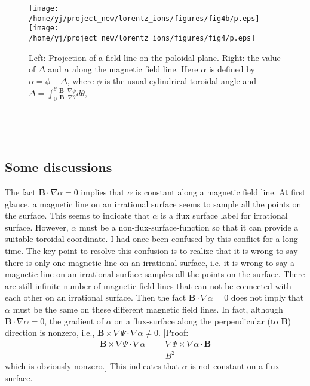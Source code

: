 \documentclass{article}
\begin{document}
\begin{figure}[h]
  \texttt{[image: /home/yj/project\_new/lorentz\_ions/figures/fig4b/p.eps]}\texttt{[image: /home/yj/project\_new/lorentz\_ions/figures/fig4/p.eps]}
  \caption{\label{17-10-2-p1}Left: Projection of a field line on the poloidal
  plane. Right: the value of $\Delta$ and $\alpha$ along the magnetic field
  line. Here $\alpha$ is defined by $\alpha = \phi - \Delta$, where $\phi$ is
  the usual cylindrical toroidal angle and $\Delta = \int_0^{\theta}
  \frac{\mathbf{B} \cdot \nabla \phi}{\mathbf{B} \cdot \nabla \theta} d
  \theta,$}
\end{figure}

\

\

\subsection{Some discussions}

The fact $\mathbf{B} \cdot \nabla \alpha = 0$ implies that $\alpha$ is
constant along a magnetic field line. At first glance, a magnetic line on an
irrational surface seems to sample all the points on the surface. This seems
to indicate that $\alpha$ is a flux surface label for irrational surface.
However, $\alpha$ must be a non-flux-surface-function so that it can provide a
suitable toroidal coordinate. I had once been confused by this conflict for a
long time. The key point to resolve this confusion is to realize that it is
wrong to say there is only one magnetic line on an irrational surface, i.e. it
is wrong to say a magnetic line on an irrational surface samples all the
points on the surface. There are still infinite number of magnetic field lines
that can not be connected with each other on an irrational surface. Then the
fact $\mathbf{B} \cdot \nabla \alpha = 0$ does not imply that $\alpha$ must be
the same on these different magnetic field lines. In fact, although
$\mathbf{B} \cdot \nabla \alpha = 0$, the gradient of $\alpha$ on a
flux-surface along the perpendicular (to $\mathbf{B}$) direction is nonzero,
i.e., $\mathbf{B} \times \nabla \Psi \cdot \nabla \alpha \neq 0$. [Proof:
\begin{eqnarray}
  \mathbf{B} \times \nabla \Psi \cdot \nabla \alpha & = & \nabla \Psi \times
  \nabla \alpha \cdot \mathbf{B} \nonumber\\
  & = & B^2 
\end{eqnarray}
which is obviously nonzero.] This indicates that $\alpha$ is not constant on a
flux-surface.
\end{document}
